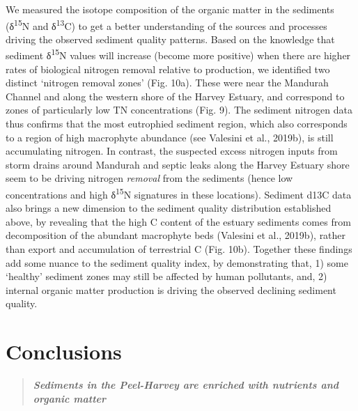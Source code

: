 \documentclass[
]{book}
\begin{document}
We measured the isotope composition of the organic matter in the sediments (δ\textsuperscript{15}N and δ\textsuperscript{13}C) to get a better understanding of the sources and processes driving the observed sediment quality patterns. Based on the knowledge that sediment δ\textsuperscript{15}N values will increase (become more positive) when there are higher rates of biological nitrogen removal relative to production, we identified two distinct `nitrogen removal zones' (Fig. 10a). These were near the Mandurah Channel and along the western shore of the Harvey Estuary, and correspond to zones of particularly low TN concentrations (Fig. 9). The sediment nitrogen data thus confirms that the most eutrophied sediment region, which also corresponds to a region of high macrophyte abundance (see Valesini et al., 2019b), is still accumulating nitrogen. In contrast, the suspected excess nitrogen inputs from storm drains around Mandurah and septic leaks along the Harvey Estuary shore seem to be driving nitrogen \emph{removal} from the sediments (hence low concentrations and high δ\textsuperscript{15}N signatures in these locations). Sediment d13C data also brings a new dimension to the sediment quality distribution established above, by revealing that the high C content of the estuary sediments comes from decomposition of the abundant macrophyte beds (Valesini et al., 2019b), rather than export and accumulation of terrestrial C (Fig. 10b). Together these findings add some nuance to the sediment quality index, by demonstrating that, 1) some `healthy' sediment zones may still be affected by human pollutants, and, 2) internal organic matter production is driving the observed declining sediment quality.

\hypertarget{conclusions-3}{%
\section{Conclusions}\label{conclusions-3}}

\begin{quote}
\textbf{\emph{Sediments in the Peel-Harvey are enriched with nutrients and organic matter}}
\end{quote}
\end{document}
